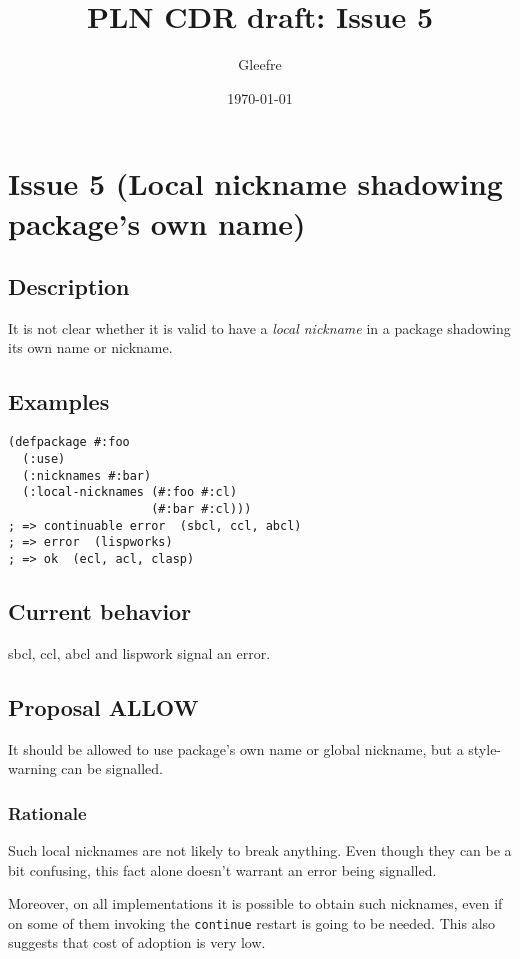 \documentclass[11pt]{article}
\author{Gleefre}
\date{\today}
\title{PLN CDR draft: Issue 5}
\begin{document}
\maketitle

\section{Issue 5 (Local nickname shadowing package's own name)}
\label{sec:org0a497ad}
\subsection{Description}
\label{sec:org0206dcb}
It is not clear whether it is valid to have a \emph{local nickname} in a package
shadowing its own name or nickname.
\subsection{Examples}
\label{sec:org27fb4a6}
\begin{verbatim}
(defpackage #:foo
  (:use)
  (:nicknames #:bar)
  (:local-nicknames (#:foo #:cl)
                    (#:bar #:cl)))
; => continuable error  (sbcl, ccl, abcl)
; => error  (lispworks)
; => ok  (ecl, acl, clasp)
\end{verbatim}
\subsection{Current behavior}
\label{sec:org194c82f}
sbcl, ccl, abcl and lispwork signal an error.
\subsection{Proposal ALLOW}
\label{sec:org47c6420}
It should be allowed to use package's own name or global nickname, but a
style-warning can be signalled.
\subsubsection{Rationale}
\label{sec:org803e50a}
Such local nicknames are not likely to break anything. Even though they can be a
bit confusing, this fact alone doesn't warrant an error being signalled.

Moreover, on all implementations it is possible to obtain such nicknames, even if
on some of them invoking the \texttt{continue} restart is going to be needed. This also
suggests that cost of adoption is very low.
\end{document}
